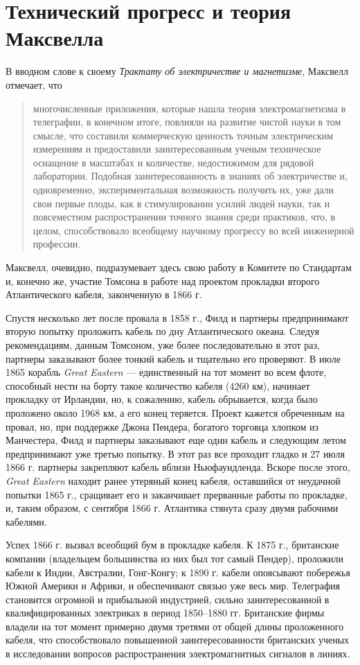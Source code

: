 \documentclass[12pt, oneside, a4paper]{article}
\begin{document}
\section{Технический прогресс и теория Максвелла}
В вводном слове к своему \emph{Трактату об электричестве и магнетизме}, Максвелл отмечает, что 
\begin{quote}
\small
многочисленные приложения, которые нашла теория электромагнетизма в телеграфии, в конечном итоге, повлияли на развитие чистой науки в том смысле, что составили коммерческую ценность точным электрическим измерениям и предоставили заинтересованным ученым техническое оснащение в масштабах и количестве, недостижимом для рядовой лаборатории. Подобная заинтересованность в знаниях об электричестве и, одновременно, экспериментальная возможность получить их, уже дали свои первые плоды, как в стимулировании усилий людей науки, так и повсеместном распространении точного знания среди практиков, что, в целом, способствовало  всеобщему научному прогрессу во всей инженерной профессии.
\end{quote}
Максвелл, очевидно, подразумевает здесь свою работу в Комитете по Стандартам и, конечно же, участие Томсона в работе над проектом прокладки второго Атлантического кабеля, законченную в 1866 г.

Спустя несколько лет после провала в 1858 г., Филд и партнеры предпринимают вторую попытку проложить кабель по дну Атлантического океана. Следуя рекомендациям, данным Томсоном, уже более последовательно в этот раз, партнеры заказывают более тонкий кабель и тщательно его проверяют. В июле 1865 корабль \emph{Great Eastern} --- единственный на тот момент во всем флоте, способный нести на борту такое количество кабеля (4260 км), начинает прокладку от Ирландии, но, к сожалению, кабель обрывается, когда было проложено около 1968 км, а его конец теряется. Проект кажется обреченным на провал, но, при поддержке Джона Пендера, богатого торговца хлопком из Манчестера, Филд и партнеры заказывают еще один кабель и следующим летом предпринимают уже третью попытку. В этот раз все проходит гладко и 27 июля 1866 г. партнеры закрепляют кабель вблизи Ньюфаундленда. Вскоре после этого, \emph{Great Eastern} находит ранее утеряный конец кабеля, оставшийся от неудачной попытки 1865 г., сращивает его и заканчивает прерванные работы по прокладке, и, таким образом, с сентября 1866 г. Атлантика стянута сразу двумя рабочими кабелями.

Успех 1866 г. вызвал всеобщий бум в прокладке кабеля. К 1875 г., британские компании (владельцем большинства из них был тот самый Пендер), проложили кабели к Индии, Австралии, Гонг-Конгу; к 1890 г. кабели опоясывают побережья Южной Америки и Африки, и обеспечивают связью уже весь мир. Телеграфия становится огромной и прибыльной индустрией, сильно заинтересованной в квалифицированных электриках в период 1850--1880 гг. Британские фирмы владели на тот момент примерно двумя третями от общей длины проложенного кабеля, что способствовало повышенной заинтересованности британских ученых в исследовании вопросов распространения электромагнитных сигналов в линиях.
\end{document}
